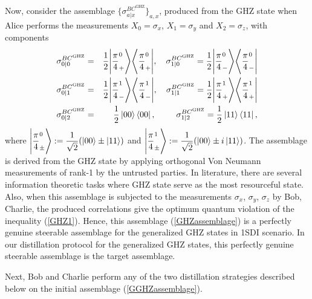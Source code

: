 \documentclass[reprint,superscriptaddress,nofootinbib,amsmath,amssymb,aps,pra,longbibliography]{revtex4-1}
\begin{document}
Now, consider the  assemblage $\{\sigma_{a|x}^{{BC}^{\text{GHZ}}}\}_{a,x}$, produced from the GHZ state when Alice performs the measurements $X_0=\sigma_x$, $X_1=\sigma_y$ and $X_2=\sigma_z$, with components
\begin{eqnarray}
	\sigma_{0|0}^{{BC}^{\text{GHZ}}} &=& \frac{1}{2} \Bigg| \frac{\pi}{4}_+^0 \Bigg\rangle \Bigg\langle \frac{\pi}{4}_+^0 \Bigg|,\quad 
	\sigma_{1|0}^{{BC}^{\text{GHZ}}} = \frac{1}{2} \Bigg| \frac{\pi}{4}_-^0 \Bigg\rangle \Bigg\langle \frac{\pi}{4}_-^0 \Bigg| \nonumber \\ 
\sigma_{0|1}^{{BC}^{\text{GHZ}}} &=& \frac{1}{2} \Bigg| \frac{\pi}{4}_-^1 \Bigg\rangle \Bigg\langle \frac{\pi}{4}_-^1 \Bigg|,\quad 
\sigma_{1|1}^{{BC}^{\text{GHZ}}} = \frac{1}{2} \Bigg| \frac{\pi}{4}_+^1 \Bigg\rangle \Bigg\langle \frac{\pi}{4}_+^1 \Bigg| \nonumber \\ 
	\sigma_{0|2}^{{BC}^{\text{GHZ}}} &=& \frac{1}{2} \ket{00}\bra{00},\quad  \hspace{0.5cm}
	\sigma_{1|2}^{{BC}^{\text{GHZ}}} = \frac{1}{2} \ket{11}\bra{11},
	\label{GHZassemblage}
\end{eqnarray}
where $\Bigg| \dfrac{\pi}{4}_{\pm}^0 \Bigg\rangle:= \dfrac{1}{\sqrt{2}}(\ket{00} \pm \ket{11})$ and  $\Bigg| \dfrac{\pi}{4}_{\pm}^1 \Bigg\rangle:= \dfrac{1}{\sqrt{2}}( \ket{00} \pm i  \ket{11})$. The assemblage is derived from the GHZ state by applying orthogonal Von Neumann measurements of rank-1 by the untrusted parties. In literature, there are several information theoretic tasks where GHZ state serve as the most resourceful state. Also, when this assemblage is subjected to the measurements $\sigma_x$,  $\sigma_y$, $\sigma_z$ by Bob, Charlie,  the produced correlations give the optimum quantum violation of the inequality (\ref{GHZ1}). Hence,  this assemblage (\ref{GHZassemblage}) is a perfectly genuine steerable assemblage for the generalized GHZ states in 1SDI scenario. In our distillation protocol for the generalized GHZ states, this perfectly genuine steerable assemblage is the target assemblage.

Next, Bob and Charlie perform any of the two distillation strategies described below on the initial assemblage (\ref{GGHZassemblage}).
\end{document}
